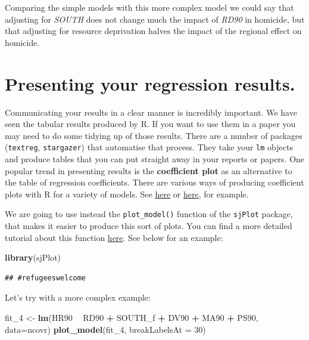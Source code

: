 \documentclass[]{book}
\newenvironment{Shaded}{\begin{snugshade}}{\end{snugshade}}
\newcommand{\DataTypeTok}[1]{\textcolor[rgb]{0.13,0.29,0.53}{#1}}
\newcommand{\DecValTok}[1]{\textcolor[rgb]{0.00,0.00,0.81}{#1}}
\newcommand{\KeywordTok}[1]{\textcolor[rgb]{0.13,0.29,0.53}{\textbf{#1}}}
\newcommand{\NormalTok}[1]{#1}
\newcommand{\OperatorTok}[1]{\textcolor[rgb]{0.81,0.36,0.00}{\textbf{#1}}}
\newcommand{\StringTok}[1]{\textcolor[rgb]{0.31,0.60,0.02}{#1}}
\begin{document}
Comparing the simple models with this more complex model we could say that adjusting for \emph{SOUTH} does not change much the impact of \emph{RD90} in homicide, but that adjusting for resource deprivation halves the impact of the regional effect on homicide.

\hypertarget{presenting-your-regression-results.}{%
\section{Presenting your regression results.}\label{presenting-your-regression-results.}}

Communicating your results in a clear manner is incredibly important. We have seen the tabular results produced by R. If you want to use them in a paper you may need to do some tidying up of those results. There are a number of packages (\texttt{textreg}, \texttt{stargazer}) that automatise that process. They take your \texttt{lm} objects and produce tables that you can put straight away in your reports or papers. One popular trend in presenting results is the \textbf{coefficient plot} as an alternative to the table of regression coefficients. There are various ways of producing coefficient plots with R for a variety of models. See \href{https://www.r-statistics.com/2010/07/visualization-of-regression-coefficients-in-r/}{here} or \href{http://felixhaass.de/dataviz_ggplot2/session4.html}{here}, for example.

We are going to use instead the \texttt{plot\_model()} function of the \texttt{sjPlot} package, that makes it easier to produce this sort of plots. You can find a more detailed tutorial about this function \href{https://strengejacke.wordpress.com/2017/10/23/one-function-to-rule-them-all-visualization-of-regression-models-in-rstats-w-sjplot/}{here}. See below for an example:

\begin{Shaded}
\begin{Highlighting}[]
\KeywordTok{library}\NormalTok{(sjPlot)}
\end{Highlighting}
\end{Shaded}

\begin{verbatim}
## #refugeeswelcome
\end{verbatim}

Let's try with a more complex example:

\begin{Shaded}
\begin{Highlighting}[]
\NormalTok{fit_}\DecValTok{4}\NormalTok{ <-}\StringTok{ }\KeywordTok{lm}\NormalTok{(HR90 }\OperatorTok{~}\StringTok{ }\NormalTok{RD90 }\OperatorTok{+}\StringTok{ }\NormalTok{SOUTH_f }\OperatorTok{+}\StringTok{ }\NormalTok{DV90 }\OperatorTok{+}\StringTok{ }\NormalTok{MA90 }\OperatorTok{+}\StringTok{ }\NormalTok{PS90, }\DataTypeTok{data=}\NormalTok{ncovr)}
\KeywordTok{plot_model}\NormalTok{(fit_}\DecValTok{4}\NormalTok{, }\DataTypeTok{breakLabelsAt =} \DecValTok{30}\NormalTok{)}
\end{Highlighting}
\end{Shaded}
\end{document}
